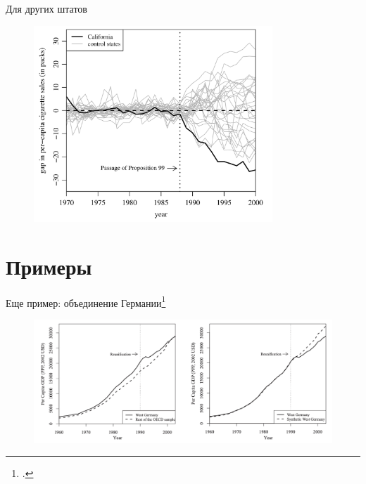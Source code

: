 \begin{frame}{Для других штатов}
\begin{figure}
    \centering
    \includegraphics[width=0.8\textwidth]{Images/california_placebo.png}
\end{figure}
\end{frame}

\section{Примеры}
\begin{frame}{Еще пример: объединение Германии\footcite{abadie2015comparative}}
    \begin{figure}
        \centering
        \includegraphics[width=\textwidth]{Images/germany_basic.png}
    \end{figure}
\end{frame}

